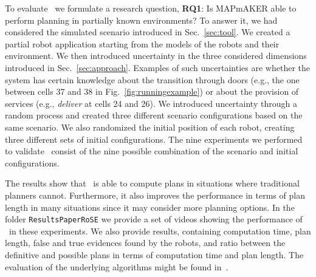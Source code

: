 

To evaluate  \toolName\ we formulate a research question,
\textbf{RQ1}: Is MAPmAKER able to perform planning in partially known environments?
To answer it, we  had considered the simulated scenario introduced in Sec.~\ref{sec:tool}.
We created a partial robot application starting from the models of the robots and their environment.
We then introduced uncertainty in the three considered dimensions introduced in Sec.~\ref{sec:approach}.
Examples of such uncertainties are whether the system has certain knowledge about the transition through doors (e.g., the one between cells 37 and 38 in Fig.~\ref{fig:runningexample}) or about the provision of services (e.g., \emph{deliver} at cells 24 and 26).
We introduced uncertainty through a random process and created three different scenario configurations based on the same scenario.
We also randomized the initial position of each robot, creating three different sets of initial configurations.
The nine experiments we performed to validate \toolName~consist of the nine possible combination of the scenario and initial configurations.

The results show that \toolName~is able to compute plans in situations where traditional planners cannot. 
Furthermore, it also improves the performance in terms of plan length in many situations since it may consider more planning options.
In the folder \texttt{ResultsPaperRoSE} we provide a set of videos showing the performance of \toolName~in these experiments.
We also provide results, containing computation time, plan length, false and true evidences found by the robots, and ratio between the definitive and possible plans in terms of computation time and plan length.
The evaluation of the underlying algorithms might be found in~\cite{menghi2018multi}. 

